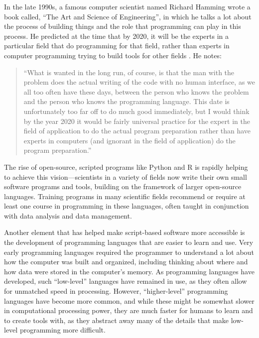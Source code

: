 \documentclass[]{tufte-book}
\begin{document}
In the late 1990s, a famous computer scientist named Richard Hamming wrote a
book called, ``The Art and Science of Engineering'', in which he talks a lot about
the process of building things and the role that programming can play in this
process. He predicted at the time that by 2020, it will be the experts in a
particular field that do programming for that field, rather than experts in
computer programming trying to build tools for other fields \citep{hamming1997art}.
He notes:

\begin{quote}
``What is wanted in the long run, of course, is that the man with the problem
does the actual writing of the code with no human interface, as we all too often
have these days, between the person who knows the problem and the person who
knows the programming language. This date is unfortunately too far off to
do much good immediately, but I would think by the year 2020 it would be
fairly universal practice for the expert in the field of application to do
the actual program preparation rather than have experts in computers (and
ignorant in the field of application) do the program preparation.'' \citep{hamming1997art}
\end{quote}

The rise of open-source, scripted programs like Python and R is rapidly helping to
achieve this vision---scientists in a variety of fields now write their own
small software programs and tools, building on the framework of larger
open-source languages. Training programs in many scientific fields recommend
or require at least one course in programming in these languages, often
taught in conjunction with data analysis and data management.

Another element that has helped make script-based software more accessible is
the development of programming languages that are easier to learn and use. Very
early programming languages required the programmer to understand a lot about
how the computer was built and organized, including thinking about where and how
data were stored in the computer's memory. As programming languages have
developed, such ``low-level'' languages have remained in use, as they often allow
for unmatched speed in processing. However, ``higher-level'' programming languages
have become more common, and while these might be somewhat slower in
computational processing power, they are much faster for humans to learn and to
create tools with, as they abstract away many of the details that make low-level
programming more difficult.
\end{document}
